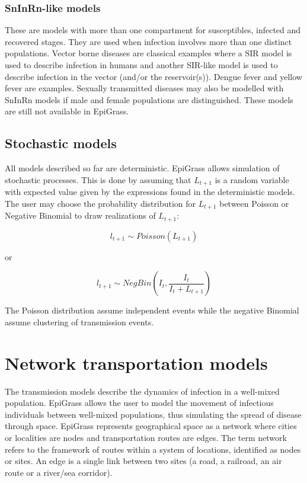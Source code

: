 \subsubsection{SnInRn-like models}
These are models with more than one compartment for susceptibles, infected and recovered stages. They are used when infection involves more than one distinct populations. Vector borne diseases are classical examples where a SIR model is used to describe infection in humans and another SIR-like model is used to describe infection in the vector (and/or the reservoir(s)). Dengue fever and yellow fever are examples. Sexually transmitted diseases may also be modelled with SnInRn models if male and female populations are distinguished. These models are still not available in EpiGrass.


\subsection{Stochastic models}

All models described so far are deterministic. EpiGrass allows simulation of stochastic processes. This is done by assuming that $L_{t+1}$ is a random variable with expected value given by the expressions found in the deterministic models. The user may choose the probability distribution for $L_{t+1}$ between Poisson or Negative Binomial to draw realizations of $L_{t+1}$:

$$
l_{t+1} \sim Poisson (L_{t+1})
$$

\begin{center}
or 
\end{center}

$$
l_{t+1} \sim NegBin (I_t, \frac{I_t}{I_t+L_{t+1}}) 
$$

The Poisson distribution assume independent events while the negative Binomial assume clustering of transmission events. 


\section{Network transportation models}


The transmission models describe the dynamics of infection in a well-mixed population. EpiGrass allows the user to model the movement of infectious individuals between well-mixed populations, thus simulating the spread of disease through space. EpiGrass represents geographical space as a network where cities or localities are nodes and transportation routes are edges. The term network refers to the framework of routes within a system of locations, identified as nodes or sites. An edge is a single link between two sites (a road, a railroad, an air route or a river/sea corridor).

